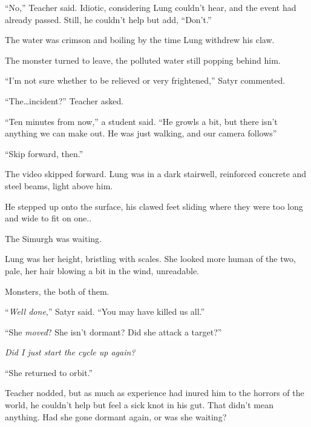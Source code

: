 ``No,'' Teacher said.  Idiotic, considering Lung couldn't hear, and the event had already passed.  Still, he couldn't help but add, ``Don't.''



The water was crimson and boiling by the time Lung withdrew his claw.



The monster turned to leave, the polluted water still popping behind him.



``I'm not sure whether to be relieved or very frightened,'' Satyr commented.



``The\ldots incident?'' Teacher asked.



``Ten minutes from now,'' a student said.  ``He growls a bit, but there isn't anything we can make out.  He was just walking, and our camera follows''



``Skip forward, then.''



The video skipped forward.  Lung was in a dark stairwell, reinforced concrete and steel beams, light above him.



He stepped up onto the surface, his clawed feet sliding where they were too long and wide to fit on one..



The Simurgh was waiting.



Lung was her height, bristling with scales.  She looked more human of the two, pale, her hair blowing a bit in the wind, unreadable.



Monsters, the both of them.



``\emph{Well done},'' Satyr said.  ``You may have killed us all.''



``She \emph{moved}?  She isn't dormant?  Did she attack a target?''



\emph{Did I just start the cycle up again?}



``She returned to orbit.''



Teacher nodded, but as much as experience had inured him to the horrors of the world, he couldn't help but feel a sick knot in his gut.  That didn't mean anything.  Had she gone dormant again, or was she waiting?



